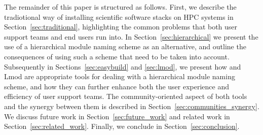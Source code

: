 The remainder of this paper is structured as follows. First, we describe the
tradiotional way of installing scientific software stacks on HPC systems in
Section~\ref{sec:traditional}, highlighting the common problems that both user
support teams and end users run into. In Section~\ref{sec:hierarchical} we
present the use of a hierarchical module naming scheme as an alternative, and
outline the consequences of using such a scheme that need to be taken into
account. Subsequently in Sections~\ref{sec:easybuild} and \ref{sec:lmod}, we present
how \easybuild{} and Lmod are appropriate tools for dealing with a hierarchical
module naming scheme, and how they can further enhance both the user experience and
efficiency of user support teams. The community-oriented aspect of both tools and the
synergy between them is described in Section~\ref{sec:communities_synergy}. We discuss
future work in Section~\ref{sec:future_work} and
related work in Section~\ref{sec:related_work}. Finally, we conclude in
Section~\ref{sec:conclusion}.

